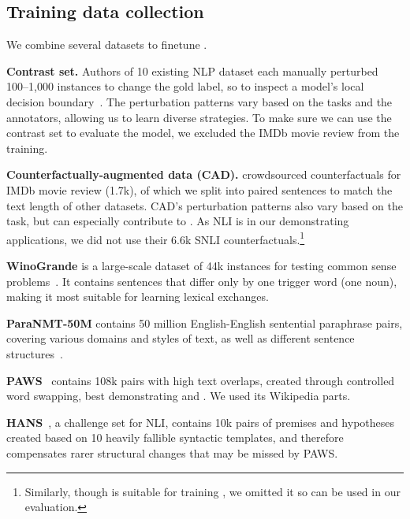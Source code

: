 \subsection{Training data collection}


We combine several datasets to finetune \sysname.

\textbf{Contrast set.}
Authors of 10 existing NLP dataset each manually perturbed 100--1,000 instances to change the gold label, so to inspect a model's local decision boundary~\cite{gardner2020contrast}.
The perturbation patterns vary based on the tasks and the annotators, allowing us to learn diverse strategies.
To make sure we can use the contrast set to evaluate the \sst model, we excluded the IMDb movie review from the training.


\textbf{Counterfactually-augmented data (CAD).}
\citet{kaushik2019learning} crowdsourced counterfactuals for IMDb movie review (1.7k), of which we split into paired sentences to match the text length of other datasets.
CAD's perturbation patterns also vary based on the task, but can especially contribute to .
As NLI is in our demonstrating applications, we did not use their 6.6k SNLI counterfactuals.\footnote{Similarly, though \qqp is suitable for training \sysname, we omitted it so \qqp can be used in our evaluation.}


\textbf{WinoGrande} is a large-scale dataset of 44k instances for testing common sense problems~\cite{sakaguchi2019winogrande}.
It contains sentences that differ only by one trigger word (\eg one noun), making it most suitable for learning lexical exchanges.

\textbf{ParaNMT-50M} contains 50 million English-English sentential paraphrase pairs, covering various domains and styles of text, as well as different sentence structures~\cite{wieting2017paranmt}. 

\textbf{PAWS}~\cite{zhang2019paws} contains 108k pairs with high text overlaps, created through controlled word swapping, best demonstrating  and . We used its Wikipedia parts.


\textbf{HANS}~\cite{mccoy2019right}, a challenge set for NLI, contains 10k pairs of premises and hypotheses created based on 10 heavily fallible syntactic templates, and therefore compensates rarer structural changes that may be missed by PAWS.


